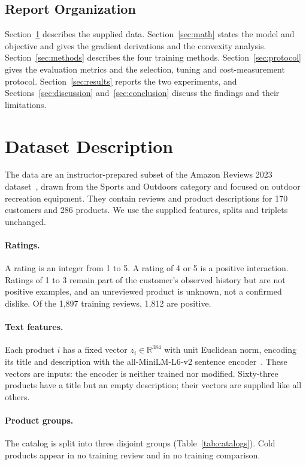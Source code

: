 \documentclass[12pt,a4paper]{article}
\newcommand{\R}{\mathbb{R}}
\begin{document}
\subsection{Report Organization}

Section~\ref{sec:data} describes the supplied data.
Section~\ref{sec:math} states the model and objective and gives the gradient
derivations and the convexity analysis.
Section~\ref{sec:methods} describes the four training methods.
Section~\ref{sec:protocol} gives the evaluation metrics and the selection,
tuning and cost-measurement protocol.
Section~\ref{sec:results} reports the two experiments, and
Sections~\ref{sec:discussion} and~\ref{sec:conclusion} discuss the findings
and their limitations.

\section{Dataset Description}
\label{sec:data}

The data are an instructor-prepared subset of the Amazon Reviews 2023
dataset~\cite{amazon2023}, drawn from the Sports and Outdoors category and
focused on outdoor recreation equipment. They contain reviews and product
descriptions for 170 customers and 286 products. We use the supplied features,
splits and triplets unchanged.

\paragraph{Ratings.} A rating is an integer from 1 to 5. A rating of 4 or 5 is
a positive interaction. Ratings of 1 to 3 remain part of the customer's
observed history but are not positive examples, and an unreviewed product is
unknown, not a confirmed dislike. Of the 1{,}897 training reviews, 1{,}812 are
positive.

\paragraph{Text features.} Each product $i$ has a fixed vector
$z_i \in \R^{384}$ with unit Euclidean norm, encoding its title and
description with the all-MiniLM-L6-v2 sentence encoder~\cite{minilm}. These
vectors are inputs: the encoder is neither trained nor modified. Sixty-three
products have a title but an empty description; their vectors are supplied
like all others.

\paragraph{Product groups.} The catalog is split into three disjoint groups
(Table~\ref{tab:catalogs}). Cold products appear in no training review and in
no training comparison.
\end{document}
